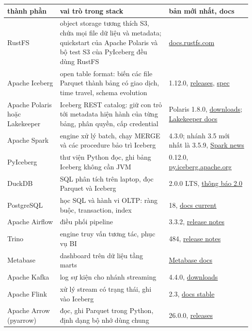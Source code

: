 \documentclass[11pt,a4paper,oneside]{report}
\newcommand{\thd}[1]{\textbf{\sffamily\small #1}}
\begin{document}
\begin{xltabular}{\textwidth}{@{}P{2.7cm} L P{3.8cm}@{}}
\toprule
\thd{thành phần} & \thd{vai trò trong stack} & \thd{bản mới nhất, docs} \\
\midrule
\endhead
\bottomrule
\endfoot
RustFS & object storage tương thích S3, chứa mọi file dữ liệu và metadata; quickstart của Apache Polaris và bộ test S3 của PyIceberg đều dùng RustFS & \href{https://docs.rustfs.com/}{docs.rustfs.com} \\
Apache Iceberg & open table format: biến các file Parquet thành bảng có giao dịch, time travel, schema evolution & 1.12.0, \href{https://iceberg.apache.org/releases/}{releases}, \href{https://iceberg.apache.org/spec/}{spec} \\
Apache Polaris hoặc Lakekeeper & Iceberg REST catalog: giữ con trỏ tới metadata hiện hành của từng bảng, phân quyền, cấp credential & Polaris 1.8.0, \href{https://polaris.apache.org/downloads/}{downloads}; \href{https://docs.lakekeeper.io/}{Lakekeeper docs} \\
Apache Spark & engine xử lý batch, chạy MERGE và các procedure bảo trì Iceberg & 4.3.0; nhánh 3.5 mới nhất là 3.5.9, \href{https://spark.apache.org/news/index.html}{Spark news} \\
PyIceberg & thư viện Python đọc, ghi bảng Iceberg không cần JVM & 0.12.0, \href{https://py.iceberg.apache.org/}{py.iceberg.apache.org} \\
DuckDB & SQL phân tích trên laptop, đọc Parquet và Iceberg & 2.0.0 LTS, \href{https://duckdb.org/2026/10/21/announcing-duckdb-200}{thông báo 2.0} \\
PostgreSQL & học SQL và hành vi OLTP: ràng buộc, transaction, index & 18, \href{https://www.postgresql.org/docs/current/}{docs current} \\
Apache Airflow & điều phối pipeline & 3.3.2, \href{https://airflow.apache.org/docs/apache-airflow/stable/release_notes.html}{release notes} \\
Trino & engine truy vấn tương tác, phục vụ BI & 484, \href{https://trino.io/docs/current/release.html}{release notes} \\
Metabase & dashboard trên dữ liệu tầng marts & \href{https://www.metabase.com/docs/latest/}{Metabase docs} \\
Apache Kafka & log sự kiện cho nhánh streaming & 4.4.0, \href{https://kafka.apache.org/community/downloads/}{downloads} \\
Apache Flink & xử lý stream có trạng thái, ghi vào Iceberg & 2.3, \href{https://nightlies.apache.org/flink/flink-docs-stable/}{docs stable} \\
Apache Arrow (pyarrow) & đọc, ghi Parquet trong Python, định dạng bộ nhớ dùng chung & 26.0.0, \href{https://arrow.apache.org/release/}{releases} \\
\end{xltabular}
\end{document}
